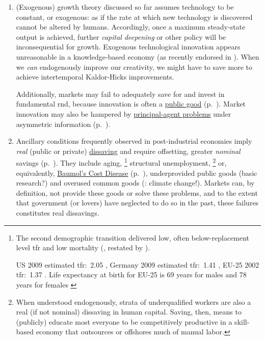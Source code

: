 \begin{enumerate}%
	\item (Exogenous) growth theory discussed so far assumes technology to be constant, or exogenous:
	as if the rate at which new technology is discovered cannot be altered by humans.
	Accordingly, once a maximum steady-state output is achieved, further \emph{capital deepening} or other policy will be inconsequential for growth.
	Exogenous technological innovation appears unreasonable in a knowledge-based economy (as recently endorsed in \citealt{Communities2009}).
	When we \emph{can} endogenously improve our creativity, we might have to save more to achieve intertemporal Kaldor-Hicks improvements.

	Additionally, markets may fail to adequately save for and invest in fundamental \gls{rnd}, because innovation is often a \hyperref[sec:public-good]{public good} (p.~\pageref{sec:public-good}).
	Market innovation may also be hampered by \hyperref[sec:principal-agent-problem]{principal-agent problems} under asymmetric information (p.~\pageref{sec:principal-agent-problem}).

	\item Ancillary conditions frequently observed in post-industrial economies imply \emph{real} (public or private) \hyperref[sec:delta-net-worth]{dissaving} and require offsetting, greater \emph{nominal} savings (p.~\pageref{sec:delta-net-worth}).
	They include aging,
	\footnote{
		The second demographic transition delivered low, often below-replacement level \gls{tfr} and low mortality (\citealt{Davis1945}, restated by \citealt{Caldwell-1976-aa}).

		US 2009 estimated \gls{tfr}:~2.05 \citep{CIA2009}, Germany 2009 estimated \gls{tfr}:~1.41 \citep{CIA2009}, EU-25 2002 \gls{tfr}:~1.37 \citep[2]{Demeny-2003-aa}.
		Life expectancy at birth for EU-25 is 69 years for males and 78 years for females \citep[2]{Demeny-2003-aa}
	}
	structural unemployment,
	\footnote{
		When understood endogenously, strata of underqualified workers are also a real (if not nominal) dissaving in human capital.
		Saving, then, means to (publicly) educate most everyone to be competitively productive in a skill-based economy that outsources or offshores much of manual labor.
	}
	or, equivalently, \hyperref[itm:non-linear-returns]{Baumol's Cost Disease} (p.~\pageref{itm:non-linear-returns}), underprovided public goods (basic research?) and overused common goods (\citealt{Stern-2006-aa}:
	climate change!).
	Markets can, by definition, not provide these goods or solve these problems, and to the extent that government (or lovers) have neglected to do so in the past, these failures constitutes real dissavings.


\end{enumerate}
